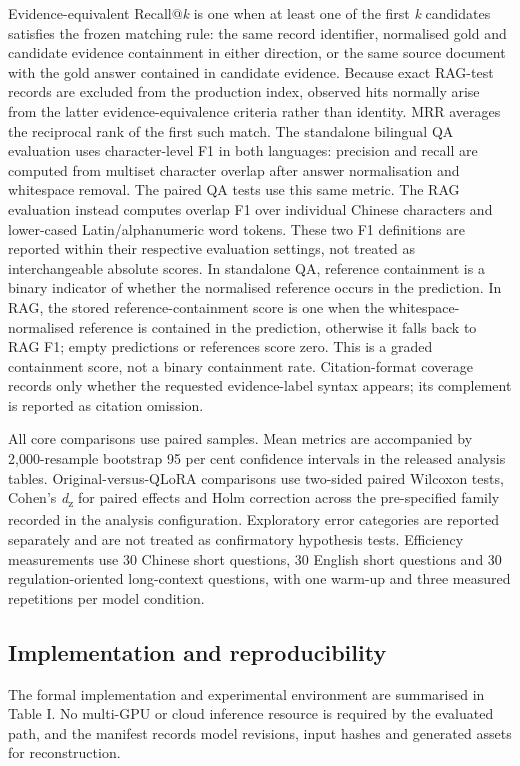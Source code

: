 Evidence-equivalent Recall@\emph{k} is one when at least one of the first \emph{k} candidates satisfies the frozen matching rule: the same record identifier, normalised gold and candidate evidence containment in either direction, or the same source document with the gold answer contained in candidate evidence. Because exact RAG-test records are excluded from the production index, observed hits normally arise from the latter evidence-equivalence criteria rather than identity. MRR averages the reciprocal rank of the first such match. The standalone bilingual QA evaluation uses character-level F1 in both languages: precision and recall are computed from multiset character overlap after answer normalisation and whitespace removal. The paired QA tests use this same metric. The RAG evaluation instead computes overlap F1 over individual Chinese characters and lower-cased Latin/alphanumeric word tokens. These two F1 definitions are reported within their respective evaluation settings, not treated as interchangeable absolute scores. In standalone QA, reference containment is a binary indicator of whether the normalised reference occurs in the prediction. In RAG, the stored reference-containment score is one when the whitespace-normalised reference is contained in the prediction, otherwise it falls back to RAG F1; empty predictions or references score zero. This is a graded containment score, not a binary containment rate. Citation-format coverage records only whether the requested evidence-label syntax appears; its complement is reported as citation omission.

All core comparisons use paired samples. Mean metrics are accompanied by 2,000-resample bootstrap 95 per cent confidence intervals in the released analysis tables. Original-versus-QLoRA comparisons use two-sided paired Wilcoxon tests, Cohen's \emph{d}\textsubscript{z} for paired effects and Holm correction across the pre-specified family recorded in the analysis configuration. Exploratory error categories are reported separately and are not treated as confirmatory hypothesis tests. Efficiency measurements use 30 Chinese short questions, 30 English short questions and 30 regulation-oriented long-context questions, with one warm-up and three measured repetitions per model condition.

\subsection{Implementation and reproducibility}

The formal implementation and experimental environment are summarised in Table I. No multi-GPU or cloud inference resource is required by the evaluated path, and the manifest records model revisions, input hashes and generated assets for reconstruction.

